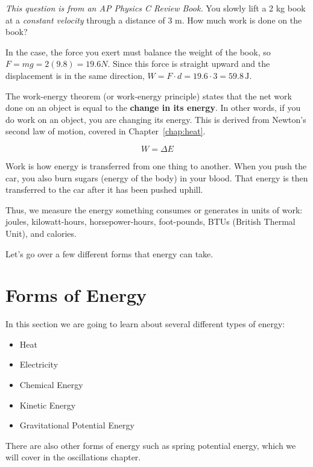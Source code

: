 \begin{Exercise}[label=work1, title={Book done by a constant force}]
	\emph{This question is from an AP Physics C Review Book.}
	You slowly lift a 2 kg book at a \emph{constant velocity} through a distance of 3 m. How much work is done on the book?
\end{Exercise}
\begin{Answer}[ref=work1]
	In the case, the force you exert must balance the weight of the book, so $F=mg=2(9.8)= 19.6 N$. 
	Since this force is straight upward and the displacement is in the same direction, $W = F\cdot d = 19.6 \cdot 3 = 59.8 \, \text{J}$.
\end{Answer}

The work-energy theorem (or work-energy principle) states that the net work done 
on an object is equal to the \textbf{change in its energy}. In other 
words, if you do work on an object, you are changing its energy. This is 
derived from Newton's second law of motion, covered in Chapter~\ref{chap:heat}. 

\[
W = \Delta E 
\]

Work is how energy is transferred from one thing to another. When you push the 
car, you also burn sugars (energy of the body) in your blood. That energy is then
transferred to the car after it has been pushed uphill.

Thus, we measure the energy something consumes or generates in units of work: 
joules, kilowatt-hours, horsepower-hours, foot-pounds, BTUs (British Thermal 
Unit), and calories.

Let's go over a few different forms that energy can take.

\section{Forms of Energy}

In this section we are going to learn about several different types of energy:
\begin{itemize}
\item Heat
\item Electricity
\item Chemical Energy
\item Kinetic Energy
\item Gravitational Potential Energy
\end{itemize}

There are also other forms of energy such as spring potential energy, which we will cover in the oscillations chapter.

